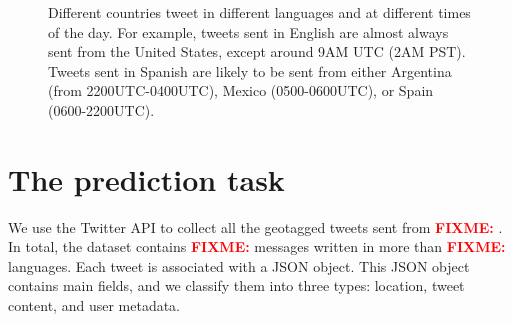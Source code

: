 \documentclass[sigconf,10pt]{acmart}
\newcommand{\fixme}[1]{\textcolor{red}{\textbf{FIXME:} {#1}}}
\begin{document}
\begin{figure}
\noindent
\noindent
\caption{
    Different countries tweet in different languages and at different times of the day.
    For example, tweets sent in English are almost always sent from the United States,
    except around 9AM UTC (2AM PST).
    Tweets sent in Spanish are likely to be sent from either Argentina (from 2200UTC-0400UTC), Mexico (0500-0600UTC), or Spain (0600-2200UTC).
}
\label{fig:time-lang}
\end{figure}

\newpage
\section{The prediction task}

We use the Twitter API to collect all the geotagged tweets sent from \fixme{}.
In total, the dataset contains \fixme{} messages written in more than \fixme{} languages.
Each tweet is associated with a JSON object.
This JSON object contains main fields, and we classify them into three types:
location, tweet content, and user metadata.
\end{document}
